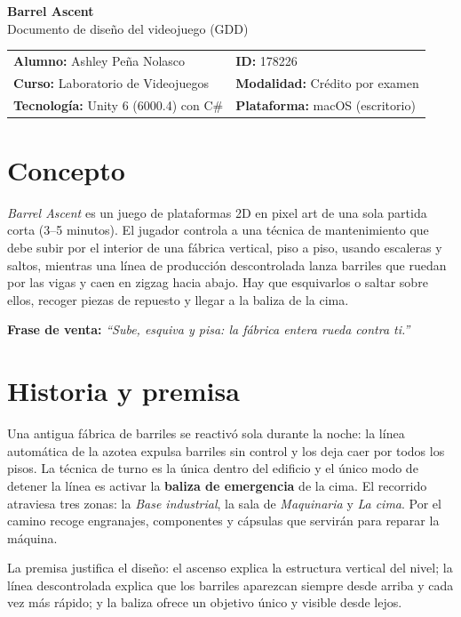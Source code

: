\documentclass[11pt,letterpaper]{article}
\newcommand{\alumno}{Ashley Peña Nolasco}
\newcommand{\matricula}{178226}
\begin{document}
\begin{center}
{\LARGE\bfseries\color{oscuro} Barrel Ascent}\\[2pt]
{\large Documento de diseño del videojuego (GDD)}\\[6pt]
\begin{tabular}{ll}
\textbf{Alumno:} \alumno & \textbf{ID:} \matricula\\
\textbf{Curso:} Laboratorio de Videojuegos & \textbf{Modalidad:} Crédito por examen\\
\textbf{Tecnología:} Unity 6 (6000.4) con C\# & \textbf{Plataforma:} macOS (escritorio)
\end{tabular}
\end{center}

\section{Concepto}
\emph{Barrel Ascent} es un juego de plataformas 2D en pixel art de una sola partida corta
(3--5 minutos). El jugador controla a una técnica de mantenimiento que debe subir por el
interior de una fábrica vertical, piso a piso, usando escaleras y saltos, mientras una línea de
producción descontrolada lanza barriles que ruedan por las vigas y caen en zigzag hacia abajo.
Hay que esquivarlos o saltar sobre ellos, recoger piezas de repuesto y llegar a la baliza de la cima.

\textbf{Frase de venta:} \emph{``Sube, esquiva y pisa: la fábrica entera rueda contra ti.''}

\section{Historia y premisa}
Una antigua fábrica de barriles se reactivó sola durante la noche: la línea automática de la azotea
expulsa barriles sin control y los deja caer por todos los pisos. La técnica de turno es la única
dentro del edificio y el único modo de detener la línea es activar la \textbf{baliza de emergencia}
de la cima. El recorrido atraviesa tres zonas: la \emph{Base industrial}, la sala de
\emph{Maquinaria} y \emph{La cima}. Por el camino recoge engranajes, componentes y cápsulas que
servirán para reparar la máquina.

La premisa justifica el diseño: el ascenso explica la estructura vertical del nivel; la línea
descontrolada explica que los barriles aparezcan siempre desde arriba y cada vez más rápido; y la
baliza ofrece un objetivo único y visible desde lejos.
\end{document}
